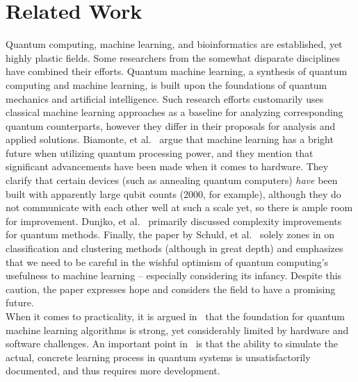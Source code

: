 \documentclass{article}
\begin{document}
\section*{Related Work}
  Quantum computing, machine learning, and bioinformatics are established, yet highly plastic fields. Some researchers from the somewhat disparate disciplines have combined their efforts. Quantum machine learning, a synthesis of quantum computing and machine learning, is built upon the foundations of quantum mechanics and artificial intelligence. Such research efforts customarily uses classical machine learning approaches as a baseline for analyzing corresponding quantum counterparts, however they differ in their proposals for analysis and applied solutions. Biamonte, et al.~\cite{biamonte} argue that machine learning has a bright future when utilizing quantum processing power, and they mention that significant advancements have been made when it comes to hardware. They clarify that certain devices (such as annealing quantum computers) \textit{have} been built with apparently large qubit counts (2000, for example), although they do not communicate with each other well at such a scale yet, so there is ample room for improvement. Dunjko, et al.~\cite{dunjko} primarily discussed complexity improvements for quantum methods. Finally, the paper by Schuld, et al.~\cite{schuld} solely zones in on classification and clustering methods (although in great depth) and emphasizes that we need to be careful in the wishful optimism of quantum computing's usefulness to machine learning -- especially considering its infancy. Despite this caution, the paper expresses hope and considers the field to have a promising future. \\

  When it comes to practicality, it is argued in~\cite{biamonte} that the foundation for quantum machine learning algorithms is strong, yet considerably limited by hardware and software challenges. An important point in~\cite{schuld} is that the ability to simulate the actual, concrete learning process in quantum systems is unsatisfactorily documented, and thus requires more development. \\
\end{document}
